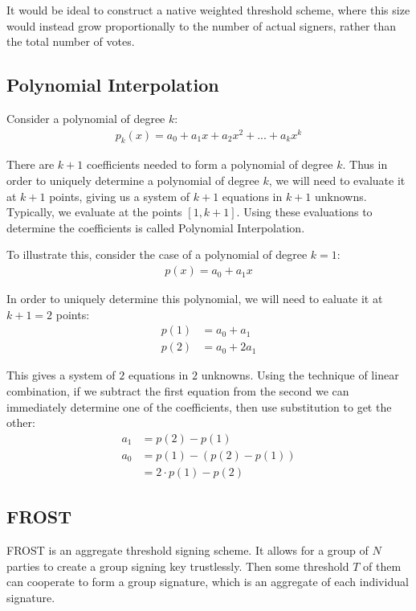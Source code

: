 \documentclass{article}
\begin{document}
It would be ideal to construct a native weighted threshold scheme, where this size would instead grow proportionally to the number of actual signers, rather than the total number of votes.  

\subsection{
  Polynomial Interpolation
}

Consider a polynomial of degree $k$:
\begin{align}
  p_k(x) = a_0 + a_1 x + a_2 x^2 + ... + a_k x^k
\end{align}

There are $k+1$ coefficients needed to form a polynomial of degree $k$.  Thus in order to uniquely determine a polynomial of degree $k$, we will need to evaluate it at $k+1$ points, giving us a system of $k+1$ equations in $k+1$ unknowns.  Typically, we evaluate at the points $[1, k+1]$.  Using these evaluations to determine the coefficients is called Polynomial Interpolation.

To illustrate this, consider the case of a polynomial of degree $k = 1$:
\begin{align}
  p(x) = a_0 + a_1 x\nonumber
\end{align}

In order to uniquely determine this polynomial, we will need to ealuate it at $k+1 = 2$ points:
\begin{align}
  p(1) &= a_0 + a_1\nonumber\\
  p(2) &= a_0 + 2 a_1\nonumber
\end{align}

This gives a system of $2$ equations in $2$ unknowns.  Using the technique of linear combination, if we subtract the first equation from the second we can immediately determine one of the coefficients, then use substitution to get the other:
\begin{align}
  a_1 &= p(2) - p(1)\nonumber\\
  a_0 &= p(1) - (p(2) - p(1))\nonumber\\
      &= 2 \cdot p(1) - p(2)\nonumber
\end{align}

\newpage
\onecolumn
\subsection{
  FROST
}

FROST is an aggregate threshold signing scheme.  It allows for a group of $N$ parties to create a group signing key trustlessly.  Then some threshold $T$ of them can cooperate to form a group signature, which is an aggregate of each individual signature.
\end{document}
